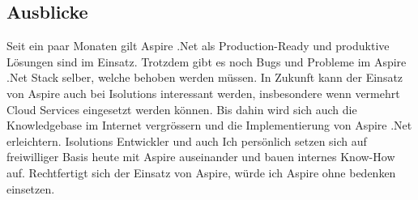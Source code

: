     \subsection{Ausblicke}
        Seit ein paar Monaten gilt Aspire .Net als Production-Ready und produktive Lösungen sind im Einsatz. Trotzdem gibt es noch Bugs und Probleme im Aspire .Net Stack selber, welche behoben werden müssen. In Zukunft kann der Einsatz von Aspire auch bei Isolutions interessant werden, insbesondere wenn vermehrt Cloud Services eingesetzt werden können. Bis dahin wird sich auch die Knowledgebase im Internet vergrössern und die Implementierung von Aspire .Net erleichtern. Isolutions Entwickler und auch Ich persönlich setzen sich auf freiwilliger Basis heute mit Aspire auseinander und bauen internes Know-How auf. Rechtfertigt sich der Einsatz von Aspire, würde ich Aspire ohne bedenken einsetzen.
        

